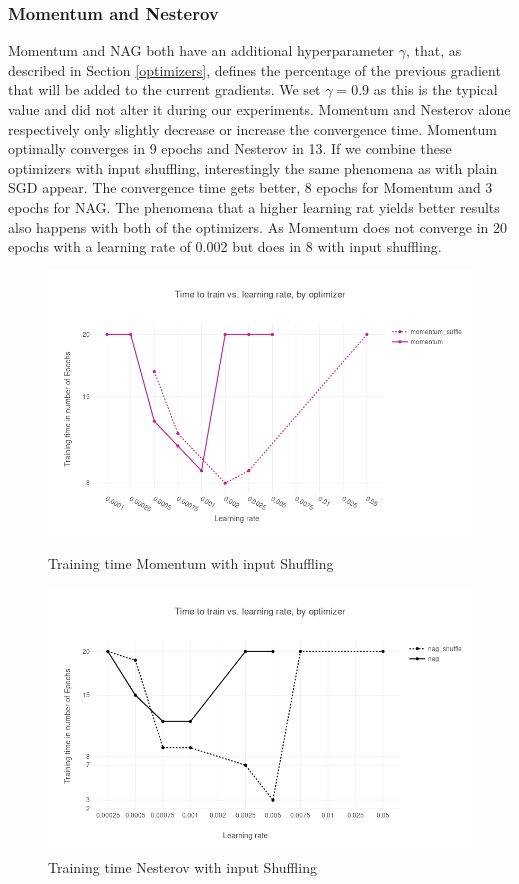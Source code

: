 \documentclass[conference]{IEEEtran}
\begin{document}
\subsubsection{Momentum and Nesterov}
Momentum and NAG \cite{nag} both have an additional hyperparameter $\gamma$, that, as described in Section \ref{optimizers}, defines the percentage of the previous gradient that will be added to the current gradients. We set $\gamma = 0.9$ as this is the typical value and did not alter it during our experiments. Momentum and Nesterov alone respectively only slightly decrease or increase the convergence time. Momentum optimally converges in 9 epochs and Nesterov in 13. If we combine these optimizers with input shuffling, interestingly the same phenomena as with plain SGD appear. The convergence time gets better, 8 epochs for Momentum and 3 epochs for NAG. The phenomena that a higher learning rat yields better results also happens with both of the optimizers. As Momentum does not converge in 20 epochs with a learning rate of 0.002 but does in 8 with input shuffling.
\begin{figure}[h]
\centering
\begin{minipage}{.5\textwidth}
\centering
\includegraphics[scale=0.3]{images/results_mom_shuffle}
\caption{Training time Momentum with input Shuffling}
\label{fig:results_mom}
\label{fig:test1}
\end{minipage}%
\begin{minipage}{.5\textwidth}
\centering
\includegraphics[scale=0.3]{images/results_nag_shuffle}
\caption{Training time Nesterov with input Shuffling}
\label{fig:results_nag}
\end{minipage}
\end{figure}
\end{document}
